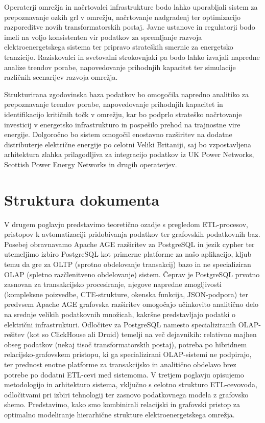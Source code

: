 \documentclass[a4paper,12pt,openright]{book}
\begin{document}
Operaterji omrežja in načrtovalci infrastrukture bodo lahko uporabljali sistem za prepoznavanje ozkih grl v omrežju, načrtovanje nadgradenj ter optimizacijo razporeditve novih transformatorskih postaj. Javne ustanove in regulatorji bodo imeli na voljo konsistenten vir podatkov za spremljanje razvoja elektroenergetskega sistema ter pripravo strateških smernic za energetsko tranzicijo. Raziskovalci in svetovalni strokovnjaki pa bodo lahko izvajali napredne analize trendov porabe, napovedovanje prihodnjih kapacitet ter simulacije različnih scenarijev razvoja omrežja.

Strukturirana zgodovinska baza podatkov bo omogočila napredno analitiko za prepoznavanje trendov porabe, napovedovanje prihodnjih kapacitet in identifikacijo kritičnih točk v omrežju, kar bo podprlo strateško načrtovanje investicij v energetsko infrastrukturo in pospešilo prehod na trajnostne vire energije. Dolgoročno bo sistem omogočil enostavno razširitev na dodatne distributerje električne energije po celotni Veliki Britaniji, saj bo vzpostavljena arhitektura zlahka prilagodljiva za integracijo podatkov iz UK Power Networks, Scottish Power Energy Networks in drugih operaterjev.




\section{Struktura dokumenta}

V drugem poglavju predstavimo teoretično ozadje s pregledom ETL-procesov, pristopov k avtomatizaciji pridobivanja podatkov ter grafovskih podatkovnih baz. Posebej obravnavamo Apache AGE razširitev za PostgreSQL in jezik cypher ter utemeljimo izbiro PostgreSQL kot primerne platforme za našo aplikacijo, kljub temu da gre za OLTP (sprotno obdelovanje transakcij) bazo in ne specializiran OLAP (spletno razčlenitveno obdelovanje) sistem. Čeprav je PostgreSQL prvotno zasnovan za transakcijsko procesiranje, njegove napredne zmogljivosti (kompleksne poizvedbe, CTE-strukture, okenska funkcija, JSON-podpora) ter predvsem Apache AGE grafovska razširitev omogočajo učinkovito analitično delo na srednje velikih podatkovnih množicah, kakršne predstavljajo podatki o električni infrastrukturi. Odločitev za PostgreSQL namesto specializiranih OLAP-rešitev (kot so ClickHouse ali Druid) temelji na več dejavnikih: relativno majhen obseg podatkov (nekaj tisoč transformatorskih postaj), potreba po hibridnem relacijsko-grafovskem pristopu, ki ga specializirani OLAP-sistemi ne podpirajo, ter prednost enotne platforme za transakcijsko in analitično obdelavo brez potrebe po dodatni ETL-cevi med sistemoma. V tretjem poglavju opisujemo metodologijo in arhitekturo sistema, vključno s celotno strukturo ETL-cevovoda, odločitvami pri izbiri tehnologij ter zasnovo podatkovnega modela z grafovsko shemo. Predstavimo, kako smo kombinirali relacijski in grafovski pristop za optimalno modeliranje hierarhične strukture elektroenergetskega omrežja.
\end{document}
